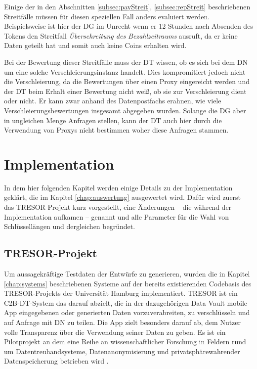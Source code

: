 \documentclass[
	fontsize=11pt,
	headings=small,
	parskip=half,           %
	bibliography=totoc,
	numbers=noenddot,       %
	open=any,               %
]{scrreprt}
\begin{document}
Einige der in den Abschnitten \ref{subsec:payStreit}, \ref{subsec:repStreit} beschriebenen Streitfälle müssen für diesen speziellen Fall anders evaluiert werden. Beispielsweise ist hier der DG im Unrecht wenn er 12 Stunden nach Absenden des Tokens den Streitfall \textit{Überschreitung des Bezahlzeitraums} ausruft, da er keine Daten geteilt hat und somit auch keine Coins erhalten wird.

Bei der Bewertung dieser Streitfälle muss der DT wissen, ob es sich bei dem DN um eine solche Verschleierungsinstanz handelt. Dies kompromitiert jedoch nicht die Verschleierung, da die Bewertungen über einen Proxy eingereicht werden und der DT beim Erhalt einer Bewertung nicht weiß, ob sie zur Verschleierung dient oder nicht. Er kann zwar anhand des Datenpostfachs erahnen, wie viele Verschleierungsbewertungen insgesamt abgegeben wurden. Solange die DG aber in ungleichen Menge Anfragen stellen, kann der DT auch hier durch die Verwendung von Proxys nicht bestimmen woher diese Anfragen stammen.




\chapter{Implementation}
\label{chap:impl}
In dem hier folgenden Kapitel werden einige Details zu der Implementation geklärt, die im Kapitel \ref{chap:auswertung} ausgewertet wird. Dafür wird zuerst das TRESOR-Projekt kurz vorgestellt, eine Änderungen -- die während der Implementation aufkamen -- genannt und alle Parameter für die Wahl von Schlüssellängen und dergleichen begründet.

\section{TRESOR-Projekt}
Um aussagekräftige Testdaten der Entwürfe zu generieren, wurden die in Kapitel \ref{chap:systems} beschriebenen Systeme auf der bereits existierenden Codebasis des TRESOR-Projekts der Universität Hamburg implementiert. TRESOR ist ein C2B-DT-System das darauf abzielt, die in der dazugehörigen Data Vault mobile App eingegebenen oder generierten Daten vorzuverabreiten, zu verschlüsseln und auf Anfrage mit DN zu teilen. Die App zielt besonders darauf ab, dem Nutzer volle Transparenz über die Verwendung seiner Daten zu geben. Es ist ein Pilotprojekt an dem eine Reihe an wissenschaftlicher Forschung in Feldern rund um Datentreuhandsysteme, Datenanonymisierung und privatsphärewahrender Datenspeicherung betrieben wird \cite{TRESOR}.
\end{document}
